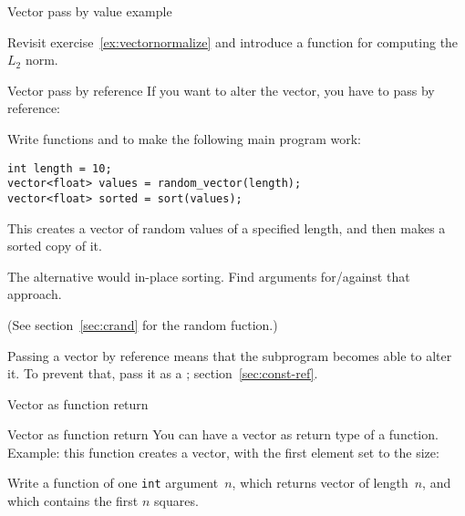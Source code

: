 \begin{block}{Vector pass by value example}
  \label{sl:vector-arg-ex}
\end{block}

\begin{exercise}
  \label{ex:vectornormalize-function}
  Revisit exercise~\ref{ex:vectornormalize} and introduce a function
  for computing the $L_2$ norm.
\end{exercise}

\begin{block}{Vector pass by reference}
  \label{sl:vector-arg-ref}
  If you want to alter the vector, you have to pass by reference:
\end{block}

\begin{exercise}
  \label{ex:vec-rand-sort}
  Write functions  and  to make the following
  main program work:
\begin{lstlisting}
int length = 10;
vector<float> values = random_vector(length);
vector<float> sorted = sort(values);
\end{lstlisting}
  This creates a vector of random values of a specified length, and
  then makes a sorted copy of it.

  The alternative would in-place sorting. Find
  arguments for/against that approach.

\end{exercise}

(See section~\ref{sec:crand} for the random fuction.)

Passing a vector by reference means that the subprogram becomes able
to alter it. To prevent that, pass it as a
; section~\ref{sec:const-ref}.

 {Vector as function return}

\begin{block}{Vector as function return}
  \label{sl:vector-return}
  You can have a vector as return type of a function.\\
  Example: this function
  creates a vector, with the first element set to the size:
\end{block}

\begin{exercise}
  \label{ex:vec-of-squares}
  Write a function of one \lstinline{int} argument~$n$, which returns vector
  of length~$n$, and which contains the first $n$ squares.
\end{exercise}

